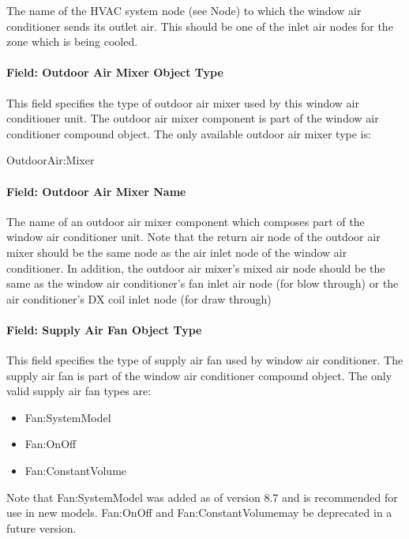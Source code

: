 The name of the HVAC system node (see Node) to which the window air conditioner sends its outlet air. This should be one of the inlet air nodes for the zone which is being cooled.

\paragraph{Field: Outdoor Air Mixer Object Type}\label{field-outdoor-air-mixer-object-type-1}

This field specifies the type of outdoor air mixer used by this window air conditioner unit. The outdoor air mixer component is part of the window air conditioner compound object. The only available outdoor air mixer type is:

OutdoorAir:Mixer

\paragraph{Field: Outdoor Air Mixer Name}\label{field-outdoor-air-mixer-name-1}

The name of an outdoor air mixer component which composes part of the window air conditioner unit. Note that the return air node of the outdoor air mixer should be the same node as the air inlet node of the window air conditioner. In addition, the outdoor air mixer's mixed air node should be the same as the window air conditioner's fan inlet air node (for blow through) or the air conditioner's DX coil inlet node (for draw through)

\paragraph{Field: Supply Air Fan Object Type}\label{field-supply-air-fan-object-type-4}

This field specifies the type of supply air fan used by window air conditioner. The supply air fan is part of the window air conditioner compound object. The only valid supply air fan types are:

\begin{itemize}
\item
  Fan:SystemModel
\item
  Fan:OnOff
\item
  Fan:ConstantVolume
\end{itemize}

Note that Fan:SystemModel was added as of version 8.7 and is recommended for use in new models.  Fan:OnOff and Fan:ConstantVolumemay be deprecated in a future version.

